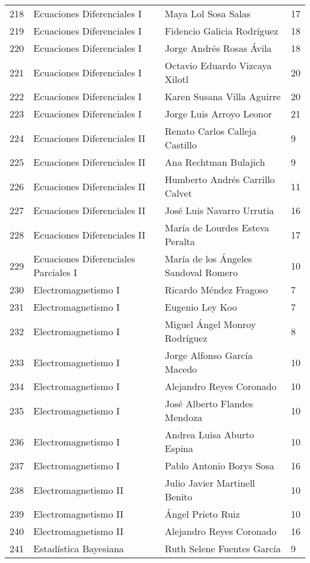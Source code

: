 \begin{table}[ht]
\begin{tabular}{rlll}
  218 & Ecuaciones Diferenciales I & Maya Lol Sosa Salas & 17 \\ 
  219 & Ecuaciones Diferenciales I & Fidencio Galicia Rodríguez & 18 \\ 
  220 & Ecuaciones Diferenciales I & Jorge Andrés Rosas Ávila & 18 \\ 
  221 & Ecuaciones Diferenciales I & Octavio Eduardo Vizcaya Xilotl & 20 \\ 
  222 & Ecuaciones Diferenciales I & Karen Susana Villa Aguirre & 20 \\ 
  223 & Ecuaciones Diferenciales I & Jorge Luis Arroyo Leonor & 21 \\ 
  224 & Ecuaciones Diferenciales II & Renato Carlos Calleja Castillo & 9 \\ 
  225 & Ecuaciones Diferenciales II & Ana Rechtman Bulajich & 9 \\ 
  226 & Ecuaciones Diferenciales II & Humberto Andrés Carrillo Calvet & 11 \\ 
  227 & Ecuaciones Diferenciales II & José Luis Navarro Urrutia & 16 \\ 
  228 & Ecuaciones Diferenciales II & María de Lourdes Esteva Peralta & 17 \\ 
  229 & Ecuaciones Diferenciales Parciales I & María de los Ángeles Sandoval Romero & 10 \\ 
  230 & Electromagnetismo I & Ricardo Méndez Fragoso & 7 \\ 
  231 & Electromagnetismo I & Eugenio Ley Koo & 7 \\ 
  232 & Electromagnetismo I & Miguel Ángel Monroy Rodríguez & 8 \\ 
  233 & Electromagnetismo I & Jorge Alfonso García Macedo & 10 \\ 
  234 & Electromagnetismo I & Alejandro Reyes Coronado & 10 \\ 
  235 & Electromagnetismo I & José Alberto Flandes Mendoza & 10 \\ 
  236 & Electromagnetismo I & Andrea Luisa Aburto Espina & 10 \\ 
  237 & Electromagnetismo I & Pablo Antonio Borys Sosa & 16 \\ 
  238 & Electromagnetismo II & Julio Javier Martinell Benito & 10 \\ 
  239 & Electromagnetismo II & Ángel Prieto Ruiz & 10 \\ 
  240 & Electromagnetismo II & Alejandro Reyes Coronado & 16 \\ 
  241 & Estadística Bayesiana & Ruth Selene Fuentes García & 9 \\ 

\end{tabular}
\end{table}
